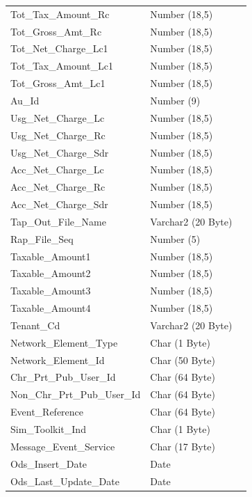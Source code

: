 \documentclass[12pt,twoside]{article}
\begin{document}
\begin{longtable}{l|l|l}
Tot\_Tax\_Amount\_Rc & Number (18,5) & \\
Tot\_Gross\_Amt\_Rc & Number (18,5) & \\
Tot\_Net\_Charge\_Lc1 & Number (18,5) & \\
Tot\_Tax\_Amount\_Lc1 & Number (18,5) & \\
Tot\_Gross\_Amt\_Lc1 & Number (18,5) & \\
Au\_Id & Number (9) & \\
Usg\_Net\_Charge\_Lc & Number (18,5) & \\
Usg\_Net\_Charge\_Rc & Number (18,5) & \\
Usg\_Net\_Charge\_Sdr & Number (18,5) & \\
Acc\_Net\_Charge\_Lc & Number (18,5) & \\
Acc\_Net\_Charge\_Rc & Number (18,5) & \\
Acc\_Net\_Charge\_Sdr & Number (18,5) & \\
Tap\_Out\_File\_Name & Varchar2 (20 Byte) & \\
Rap\_File\_Seq & Number (5) & \\
Taxable\_Amount1 & Number (18,5) & \\
Taxable\_Amount2 & Number (18,5) & \\
Taxable\_Amount3 & Number (18,5) & \\
Taxable\_Amount4 & Number (18,5) & \\
Tenant\_Cd & Varchar2 (20 Byte) & \\
Network\_Element\_Type & Char (1 Byte) & \\
Network\_Element\_Id & Char (50 Byte) & \\
Chr\_Prt\_Pub\_User\_Id & Char (64 Byte) & \\
Non\_Chr\_Prt\_Pub\_User\_Id & Char (64 Byte) & \\
Event\_Reference & Char (64 Byte) & \\
Sim\_Toolkit\_Ind & Char (1 Byte) & \\
Message\_Event\_Service & Char (17 Byte) & \\
Ods\_Insert\_Date & Date & \\
Ods\_Last\_Update\_Date & Date & \\
\hline
\end{longtable}
\normalsize
\end{document}
